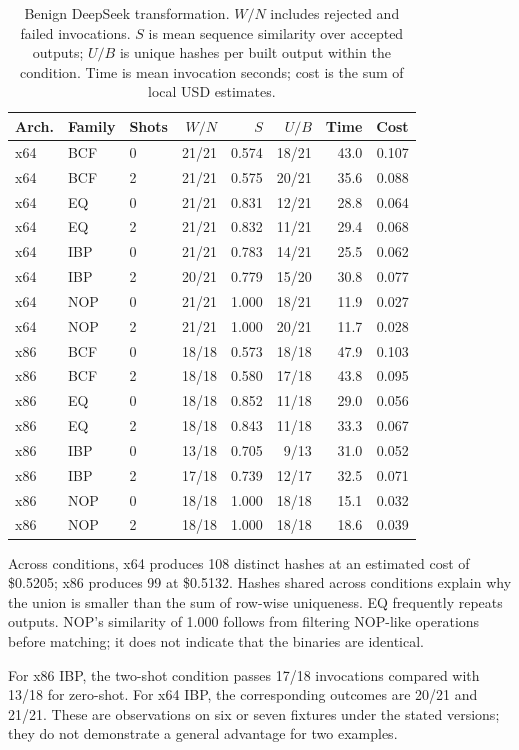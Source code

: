 \begin{table}[t]
\caption{Benign DeepSeek transformation. $W/N$ includes rejected and
failed invocations. $S$ is mean sequence similarity over accepted outputs;
$U/B$ is unique hashes per built output within the condition. Time is
mean invocation seconds; cost is the sum of local USD estimates.}
\label{tab:new_llm_benign}
\centering\small\setlength{\tabcolsep}{4pt}
\begin{tabular}{@{}lllrrrrr@{}}
\toprule
Arch. & Family & Shots & $W/N$ & $S$ & $U/B$ & Time & Cost \\
\midrule
x64 & BCF & 0 & 21/21 & 0.574 & 18/21 & 43.0 & 0.107 \\
x64 & BCF & 2 & 21/21 & 0.575 & 20/21 & 35.6 & 0.088 \\
x64 & EQ & 0 & 21/21 & 0.831 & 12/21 & 28.8 & 0.064 \\
x64 & EQ & 2 & 21/21 & 0.832 & 11/21 & 29.4 & 0.068 \\
x64 & IBP & 0 & 21/21 & 0.783 & 14/21 & 25.5 & 0.062 \\
x64 & IBP & 2 & 20/21 & 0.779 & 15/20 & 30.8 & 0.077 \\
x64 & NOP & 0 & 21/21 & 1.000 & 18/21 & 11.9 & 0.027 \\
x64 & NOP & 2 & 21/21 & 1.000 & 20/21 & 11.7 & 0.028 \\
x86 & BCF & 0 & 18/18 & 0.573 & 18/18 & 47.9 & 0.103 \\
x86 & BCF & 2 & 18/18 & 0.580 & 17/18 & 43.8 & 0.095 \\
x86 & EQ & 0 & 18/18 & 0.852 & 11/18 & 29.0 & 0.056 \\
x86 & EQ & 2 & 18/18 & 0.843 & 11/18 & 33.3 & 0.067 \\
x86 & IBP & 0 & 13/18 & 0.705 & 9/13 & 31.0 & 0.052 \\
x86 & IBP & 2 & 17/18 & 0.739 & 12/17 & 32.5 & 0.071 \\
x86 & NOP & 0 & 18/18 & 1.000 & 18/18 & 15.1 & 0.032 \\
x86 & NOP & 2 & 18/18 & 1.000 & 18/18 & 18.6 & 0.039 \\
\bottomrule
\end{tabular}
\end{table}


Across conditions, x64 produces 108 distinct hashes at an estimated cost
of \$0.5205; x86 produces 99 at \$0.5132. Hashes shared across conditions
explain why the union is smaller than the sum of row-wise uniqueness.
EQ frequently repeats outputs. NOP's similarity of 1.000 follows from
filtering NOP-like operations before matching; it does not indicate that
the binaries are identical.

For x86 IBP, the two-shot condition passes 17/18 invocations compared with
13/18 for zero-shot. For x64 IBP, the corresponding outcomes are 20/21 and
21/21. These are observations on six or seven fixtures under the stated
versions; they do not demonstrate a general advantage for two examples.
